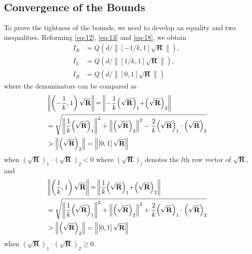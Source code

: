 \documentclass{IEEEtran}
\begin{document}
\subsection{Convergence of the Bounds}
To prove the tightness of the bounds, we need to develop an equality and two inequalities. Reforming \eqref{eq-12}, \eqref{eq-13} and \eqref{eq-18}, we obtain
\begin{equation}\label{eq-20}
\begin{split}
{I_R} &= Q\left( {  {d}/{{\left\| {\left[ { - 1/k,1} \right]\sqrt {\textbf{R}} } \right\|}}} \right),\\
{I_L} &= Q\left( {{d}/{{\left\| {\left[ {1/k,1} \right]\sqrt {\textbf{R}} } \right\|}}} \right),\\
{I_B} &= Q\left( {{d}/{{\left\| {\left[ {0,1} \right]\sqrt {\textbf{R}} } \right\|}}} \right)
\end{split}
\end{equation}
where the denominators can be compared as
\begin{equation}\label{eq-21}
\begin{split}
&\left\| {\left( { - \frac{1}{k},1} \right)\sqrt {\textbf{R}} } \right\|{\rm{ = }}\left\| { - \frac{1}{k}{{\left( {\sqrt {\textbf{R}} } \right)}_1}{\rm{ + }}{{\left( {\sqrt {\textbf{R}} } \right)}_2}} \right\|\\
 &= \sqrt {{{\left\| {\frac{1}{k}{{\left( {\sqrt {\textbf{R}} } \right)}_1}} \right\|}^2} + {{\left\| {{{\left( {\sqrt {\textbf{R}} } \right)}_2}} \right\|}^2} - \frac{2}{k}{{\left( {\sqrt {\textbf{R}} } \right)}_1} \cdot {{\left( {\sqrt {\textbf{R}} } \right)}_2}} \\
 &> \left\| {{{\left( {\sqrt {\textbf{R}} } \right)}_2}} \right\| = \left\| {\left[ {0,1} \right]\sqrt {\textbf{R}} } \right\|
\end{split}
\end{equation}
when ${( {\sqrt {\textbf{R}} } )_1} \cdot {( {\sqrt {\textbf{R}} } )_2} < 0$ where $( {\sqrt {\textbf{R}} } )_l$ denotes the $l$th row vector of $\sqrt{\textbf{R}}$, and
\begin{equation}\label{eq-22}
\begin{split}
&\left\| {\left( {\frac{1}{k},1} \right)\sqrt {\textbf{R}} } \right\|{\rm{ = }}\left\| {\frac{1}{k}{{\left( {\sqrt {\textbf{R}} } \right)}_1}{\rm{ + }}{{\left( {\sqrt {\textbf{R}} } \right)}_2}} \right\|\\
 &= \sqrt {{{\left\| {\frac{1}{k}{{\left( {\sqrt {\textbf{R}} } \right)}_1}} \right\|}^2} + {{\left\| {{{\left( {\sqrt {\textbf{R}} } \right)}_2}} \right\|}^2} + \frac{2}{k}{{\left( {\sqrt {\textbf{R}} } \right)}_1} \cdot {{\left( {\sqrt {\textbf{R}} } \right)}_2}} \\
 &> \left\| {{{\left( {\sqrt {\textbf{R}} } \right)}_2}} \right\| = \left\| {\left[ {0,1} \right]\sqrt {\textbf{R}} } \right\|
\end{split}
\end{equation}
when ${( {\sqrt {\textbf{R}} } )_1} \cdot {( {\sqrt {\textbf{R}} } )_2} \ge 0$.
\end{document}
